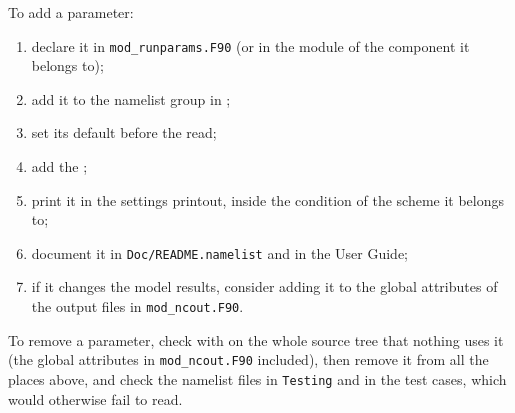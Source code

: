 To add a parameter:
\begin{enumerate}
  \item declare it in \verb=mod_runparams.F90= (or in the module of the
        component it belongs to);
  \item add it to the namelist group in ;
  \item set its default before the read;
  \item add the ;
  \item print it in the settings printout, inside the condition of the
        scheme it belongs to;
  \item document it in \verb=Doc/README.namelist= and in the User Guide;
  \item if it changes the model results, consider adding it to the global
        attributes of the output files in \verb=mod_ncout.F90=.
\end{enumerate}
To remove a parameter, check with  on the whole source tree that
nothing uses it (the global attributes in \verb=mod_ncout.F90= included),
then remove it from all the places above, and check the namelist files in
\verb=Testing= and in the test cases, which would otherwise fail to read.
